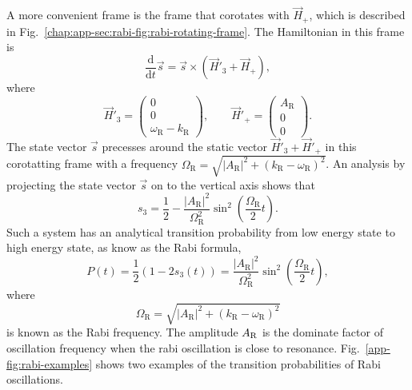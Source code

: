 


A more convenient frame is the frame that corotates with $\vec{H}_+$, which is described in Fig.~\ref{chap:app-sec:rabi-fig:rabi-rotating-frame}. The Hamiltonian in this frame is
\begin{equation}
\frac{\mathrm d}{\mathrm d t } \vec{s} = \vec{s} \times (\vec{H}'_3 + \vec{H}_+),
\end{equation}
where
\begin{equation}
\vec{H}'_3 = \begin{pmatrix}
    0 \\ 0 \\ 　\omega_{\mathrm{R}} - k_{\mathrm R}
  \end{pmatrix}, \qquad \vec{H}'_+ = \begin{pmatrix}
    A_{\mathrm{R}} \\ 0 \\ 　0
    \end{pmatrix}.
\end{equation}
The state vector $\vec{s}$ precesses around the static vector $\vec{H}'_3 + \vec{H}'_+$ in this corotatting frame with a frequency $\Omega_{\mathrm R} = \sqrt{ \lvert A_{\mathrm{R}}\rvert^2 + (k_{\mathrm{R}} - \omega_{\mathrm R})^2 }$. An analysis by projecting the state vector $\vec{s}$ on to the vertical axis shows that
\begin{equation}
s_3 = \frac{1}{2} - \frac{\lvert A_{\mathrm R}\rvert ^2}{\Omega_{\mathrm R}^2}\sin^2\left(\frac{\Omega_{\mathrm R}}{2} t\right).
\end{equation}
Such a system has an analytical transition probability from low energy state to high energy state, as know as the Rabi formula,
\begin{equation}
    P(t) = \frac{1}{2}(1- 2 s_3(t))= \frac{\left \lvert A_{\mathrm{R}} \right \rvert ^2}{ \Omega_{\mathrm R}^2 } \sin^2 \left( \frac{\Omega_{\mathrm R}}{2} t \right),
    \label{app:rabi-system-transition-probability}
\end{equation}
where
\begin{equation}
\Omega_{\mathrm R} = \sqrt{ \lvert A_{\mathrm{R}}\rvert^2 + (k_{\mathrm{R}} - \omega_{\mathrm R})^2 }
\label{app:rabi-frequency}
\end{equation} is known as the Rabi frequency. The amplitude $A_\mathrm R$ is the dominate factor of oscillation frequency when the rabi oscillation is close to resonance. Fig.~\ref{app-fig:rabi-examples} shows two examples of the transition probabilities of Rabi oscillations.

